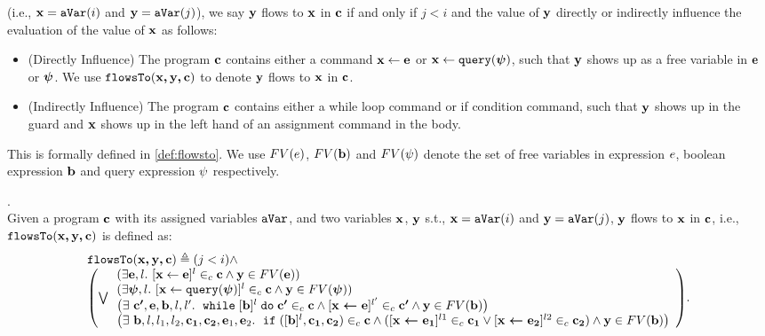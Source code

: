 \documentclass[a4paper,11pt]{article}
\begin{document}
{{(i.e., ${\boldsymbol{\mathbf{x}}} = \mathtt{aVar}(i)$ and ${\boldsymbol{\mathbf{y}}} = \mathtt{aVar}(j)$),
we say ${\boldsymbol{\mathbf{y}}}$ flows to ${\boldsymbol{\mathbf{x}}}$ in ${\boldsymbol{\mathbf{c}}}$ if and only if $j < i$ and 
the value of ${\boldsymbol{\mathbf{y}}}$ directly or indirectly influence the evaluation of the value of ${\boldsymbol{\mathbf{x}}}$ as follows:
%
\begin{itemize}
	\item (Directly Influence) The program ${\boldsymbol{\mathbf{c}}}$ contains either 
	a command $\mathrel{ {\boldsymbol{\mathbf{x}}} \leftarrow {\boldsymbol{\mathbf{e}}} }$ or $\mathrel{ {\boldsymbol{\mathbf{x}}} \leftarrow {\tt query}({\boldsymbol{\mathbf{\psi}}}) }$,
	such that ${\boldsymbol{\mathbf{y}}}$ shows up as a free variable in ${\boldsymbol{\mathbf{e}}}$ or ${\boldsymbol{\mathbf{\psi}}}$.
	We use $\mathtt{flowsTo}({\boldsymbol{\mathbf{x, y, c}}})$ to denote ${\boldsymbol{\mathbf{y}}}$ flows to ${\boldsymbol{\mathbf{x}}}$ in ${\boldsymbol{\mathbf{c}}}$.
%
	\item (Indirectly Influence) The program ${\boldsymbol{\mathbf{c}}}$ contains either a while loop
	command
	or if condition command, such that ${\boldsymbol{\mathbf{y}}}$ shows up in the guard
	and ${\boldsymbol{\mathbf{x}}}$ shows up in the left hand of an assignment command in the body.
\end{itemize}
%
This is formally defined in \ref{def:flowsto}.
We use $FV(e)$, $FV({\boldsymbol{\mathbf{b}}})$ and $FV(\psi)$ denote the set of free variables in 
expression $e$, boolean expression ${\boldsymbol{\mathbf{b}}}$ and query expression $\psi$ respectively.
%
\begin{defn}.
\label{def:flowsto}
\\
Given a program  ${\boldsymbol{\mathbf{c}}}$ with its assigned variables $\mathtt{aVar}$,
and two variables ${\boldsymbol{\mathbf{x}}}$, ${\boldsymbol{\mathbf{y}}}$ s.t., ${\boldsymbol{\mathbf{x}}} = \mathtt{aVar}(i)$ and ${\boldsymbol{\mathbf{y}}} = \mathtt{aVar}(j)$,
${\boldsymbol{\mathbf{y}}}$ flows to ${\boldsymbol{\mathbf{x}}}$ in ${\boldsymbol{\mathbf{c}}}$, i.e., $\mathtt{flowsTo}({\boldsymbol{\mathbf{x, y, c}}})$ is defined as:
%
\[
	\begin{array}{l}
	\flowsto(\ssa{x, y, c}) \triangleq 	(j < i) \land 
	\\
	\left( \bigvee
	\begin{array}{l}
	(\exists \sexpr, l . ~ [\assign{\ssa{x}}{\sexpr}]^l \in_{c} \ssa{c} 
	\land \ssa{y} \in FV(\sexpr))
	\\
	(\exists \ssa{\qexpr}, l. ~ [\assign{\ssa{x}}{\query(\ssa{\qexpr})}]^l \in_{c} \ssa{c} 
	\land \ssa{y} \in FV(\ssa{\qexpr}))
	\\
	\big(\exists  ~ \ssa{c'}, \ssa{\expr}, \sbexpr, l, l'. ~
		\ewhile [\sbexpr]^l \edo \ssa{c'} \in_{c} \ssa{c}
		\land 
		[\ssa{\assign{x}{\expr}}]^{l'} \in_{c}  \ssa{c'}
		\land \ssa{y} \in FV(\sbexpr)
	\big)
	\\
	\big(\exists ~ \sbexpr, l, l_1, l_2, \ssa{c_1}, \ssa{c_2}, \ssa{\expr}_1, \ssa{\expr}_2. ~
		\eif([\sbexpr]^l, \ssa{c_1}, \ssa{c_2}) \in_{c} \ssa{c} \land
		([\ssa{\assign{x}{\expr_1}}]^{l1} \in_{c} \ssa{c_1} \lor 
		[\ssa{\assign{x}{\expr_2}}]^{l2} \in_{c} \ssa{c_2})
		\land \ssa{y} \in FV(\sbexpr)
	\big)
	\end{array}
	\right).
	\end{array}
\]
%
\end{defn}
}
}
\end{document}
